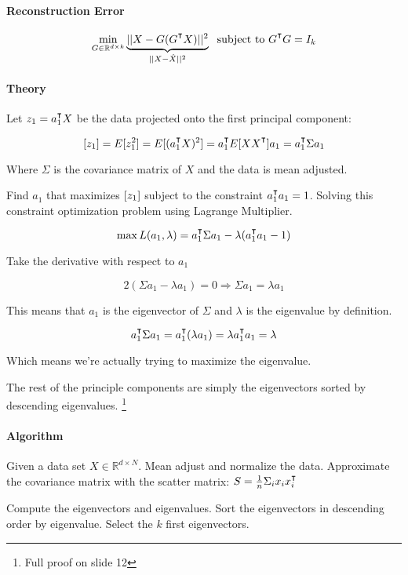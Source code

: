 \documentclass{idc_msc}
\renewcommand{\T}{{\mathpalette\raiseT\intercal}} %
\let\Var\relax
\DeclareMathOperator*{\Var}{Var}
\begin{document}
\paragraph{Reconstruction Error}

\[\min_{G \in \mathbb{R}^{d \times k}} \underbrace{|| X - G(G^\T X)||^2}_{||X - \hat{X}||^2} \; \text{ subject to }G^\T G = I_k\]

\paragraph{Theory}

Let \(z_1 = a_1^\T X\) be the data projected onto the first principal component:

\[\Var[z_1] = E[z_1^2] = E[(a_1^\T X)^2] = a_1^\T E[XX^\T]a_1 = a_1^\T \Sigma a_1\]

Where \(\Sigma\) is the covariance matrix of \(X\) and the data is mean adjusted.

Find \(a_1\) that maximizes \(\Var[z_1]\) subject to the constraint \(a_1^\T a_1 = 1\).
Solving this constraint optimization problem using Lagrange Multiplier.

\[\max L(a_1, \lambda) = a_1^\T \Sigma a_1 - \lambda(a_1^\T a_1 - 1)\]

Take the derivative with respect to \(a_1\)

\[2(\Sigma a_1 - \lambda a_1) = 0 \Rightarrow \Sigma a_1 = \lambda a_1\]

This means that \(a_1\) is the eigenvector of \(\Sigma\) and \(\lambda\) is the eigenvalue by definition.

\[a_1^\T \Sigma a_1 = a_1^\T(\lambda a_1) = \lambda a_1^\T a_1 = \lambda\]

Which means we're actually trying to maximize the eigenvalue.

The rest of the principle components are simply the eigenvectors sorted by descending eigenvalues.
\footnote{Full proof on slide 12}

\paragraph{Algorithm}

Given a data set \(X \in \mathbb{R}^{d \times N}\).
Mean adjust and normalize the data.
Approximate the covariance matrix with the scatter matrix: \(S = \frac{1}{n}\Sigma_i x_i x_i^\T\)

Compute the eigenvectors and eigenvalues.
Sort the eigenvectors in descending order by eigenvalue.
Select the \(k\) first eigenvectors.
\end{document}
